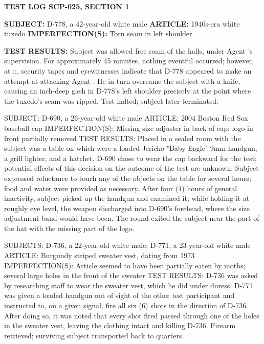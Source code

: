 \begin{leftbar}
\begin{flushleft}
\underline{\textbf{TEST LOG SCP-025, SECTION 1}}

\textbf{SUBJECT:} D-778, a 42-year-old white male\linebreak
\textbf{ARTICLE:} 1940s-era white tuxedo\linebreak
\textbf{IMPERFECTION(S):} Torn seam in left shoulder
\end{flushleft}
\textbf{TEST RESULTS:} Subject was allowed free roam of the halls, under Agent 's supervision. For approximately 45 minutes, nothing eventful occurred; however, at ::, security tapes and eyewitnesses indicate that D-778 appeared to make an attempt at attacking Agent . He in turn overcame the subject with a knife, causing an inch-deep gash in D-778's left shoulder precisely at the point where the tuxedo's seam was ripped. Test halted; subject later terminated.

SUBJECT: D-690, a 26-year-old white male
ARTICLE: 2004 Boston Red Sox baseball cap
IMPERFECTION(S): Missing size adjuster in back of cap; logo in front partially removed
TEST RESULTS: Placed in a sealed room with the subject was a table on which were a loaded Jericho "Baby Eagle" 9mm handgun, a grill lighter, and a hatchet. D-690 chose to wear the cap backward for the test; potential effects of this decision on the outcome of the test are unknown. Subject expressed reluctance to touch any of the objects on the table for several hours; food and water were provided as necessary. After four (4) hours of general inactivity, subject picked up the handgun and examined it; while holding it at roughly eye level, the weapon discharged into D-690's forehead, where the size adjustment band would have been. The round exited the subject near the part of the hat with the missing part of the logo.

SUBJECTS: D-736, a 22-year-old white male; D-771, a 23-year-old white male
ARTICLE: Burgundy striped sweater vest, dating from 1973
IMPERFECTION(S): Article seemed to have been partially eaten by moths; several large holes in the front of the sweater
TEST RESULTS: D-736 was asked by researching staff to wear the sweater vest, which he did under duress. D-771 was given a loaded handgun out of sight of the other test participant and instructed to, on a given signal, fire all six (6) shots in the direction of D-736. After doing so, it was noted that every shot fired passed through one of the holes in the sweater vest, leaving the clothing intact and killing D-736. Firearm retrieved; surviving subject transported back to quarters.


\end{leftbar}
